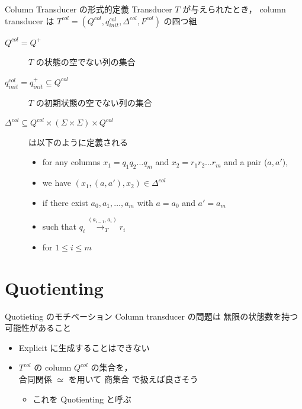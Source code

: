 \documentclass[presentation, xetex]{beamer}
\begin{document}
\begin{frame}[label={sec:org78ba19a}]{Column Transducer の形式的定義}
Transducer \(T\) が与えられたとき，
column transducer は  \(T^{col} = (Q^{col}, q_{init}^{col}, \Delta^{col}, F^{col})\) の四つ組
\begin{description}
\item[{\(Q^{col} = Q^+\)}] \(T\) の状態の空でない列の集合
\item[{\(q_{init}^{col} = q_{init}^+ \subseteq Q^{col}\)}] \(T\) の初期状態の空でない列の集合
\item[{\(\Delta^{col} \subseteq Q^{col} \times (\Sigma \times \Sigma) \times Q^{col}\)}] は以下のように定義される
\begin{itemize}
\item for any columns \(x_1 = q_1 q_2 \dots q_m\) and \(x_2 = r_1 r_2 \dots r_m\) and a pair (\(a, a')\),
\item we have \((x_1, (a, a'), x_2) \in \Delta^{col}\)
\item if there exist \(a_0, a_1, \dots, a_m\) with \(a = a_0\) and \(a' = a_m\)
\item such that \(q_i \overset{(a_{i - 1}, a_i)}{\longrightarrow_T} r_i\)
\item for \(1 \leq i \leq m\)
\end{itemize}
\end{description}
\end{frame}


\section{Quotienting}
\label{sec:org3587ef3}

\begin{frame}[label={sec:orgeeab133}]{Quotieting のモチベーション}
Column transducer の問題は \alert{\alert{無限の状態数を持つ}} 可能性があること
\begin{itemize}
\item Explicit に生成することはできない
\item \(T^{col}\) の column \(Q^{col}\) の集合を，\\
合同関係 \(\simeq\) を用いて \alert{\alert{商集合}} で扱えば良さそう
\begin{itemize}
\item これを \alert{\alert{Quotienting}} と呼ぶ
\end{itemize}
\end{itemize}
\end{frame}
\end{document}
